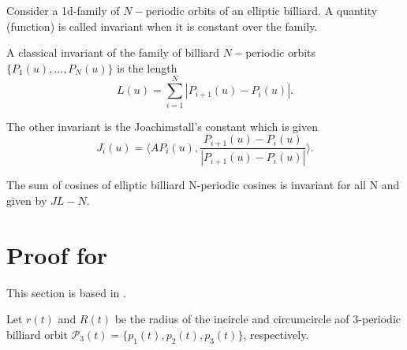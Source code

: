 

\begin{definition}
\label{def:invariant}
Consider a 1d-family of $N-$periodic orbits of an elliptic billiard.  A quantity (function) is called invariant when it is constant over the family. 
\end{definition}

A classical invariant of the family of  billiard $N-$periodic orbits $\{P_1(u),\ldots, P_N(u)\}$ is the length 
\[ L(u)=\sum_{i=1}^N |P_{i+1}(u)-P_i(u)|.\]

The other invariant  is the Joachimstall's constant which is given
\[J_i(u)= \big\langle A P_i(u),\frac{P_{i+1}(u)-P_{i }(u)}{ |P_{i+1}(u)-P_{i }(u)|}\big\rangle.\]

\begin{theorem}\label{thm:soma_cossenos_N}
The sum of cosines of elliptic billiard N-periodic cosines is invariant for all N and given by $J L - N$.
\end{theorem}

\section{Proof for }

This section is based in 
\cite{reznik2020-intelligencer, garcia2020-new-properties}.

Let $r(t)$ and $R(t)$ be the radius of the incircle and circumcircle aof 3-periodic billiard orbit $\mathcal{P}_3(t)=\{p_1(t),p_2(t),p_3(t)\}$, respectively.


